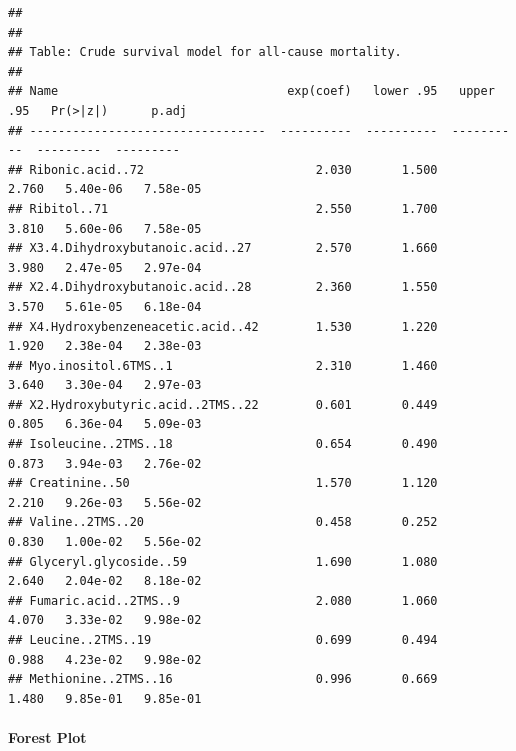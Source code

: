 \documentclass[]{article}
\newenvironment{Shaded}{\begin{snugshade}}{\end{snugshade}}
\newcommand{\CommentTok}[1]{\textcolor[rgb]{0.56,0.35,0.01}{\textit{#1}}}
\newcommand{\DataTypeTok}[1]{\textcolor[rgb]{0.13,0.29,0.53}{#1}}
\newcommand{\KeywordTok}[1]{\textcolor[rgb]{0.13,0.29,0.53}{\textbf{#1}}}
\newcommand{\NormalTok}[1]{#1}
\newcommand{\StringTok}[1]{\textcolor[rgb]{0.31,0.60,0.02}{#1}}
\let\oldparagraph\paragraph
\renewcommand{\paragraph}[1]{\oldparagraph{#1}\mbox{}}
\begin{document}
\begin{verbatim}
## 
## 
## Table: Crude survival model for all-cause mortality.
## 
## Name                                exp(coef)   lower .95   upper .95   Pr(>|z|)      p.adj
## ---------------------------------  ----------  ----------  ----------  ---------  ---------
## Ribonic.acid..72                        2.030       1.500       2.760   5.40e-06   7.58e-05
## Ribitol..71                             2.550       1.700       3.810   5.60e-06   7.58e-05
## X3.4.Dihydroxybutanoic.acid..27         2.570       1.660       3.980   2.47e-05   2.97e-04
## X2.4.Dihydroxybutanoic.acid..28         2.360       1.550       3.570   5.61e-05   6.18e-04
## X4.Hydroxybenzeneacetic.acid..42        1.530       1.220       1.920   2.38e-04   2.38e-03
## Myo.inositol.6TMS..1                    2.310       1.460       3.640   3.30e-04   2.97e-03
## X2.Hydroxybutyric.acid..2TMS..22        0.601       0.449       0.805   6.36e-04   5.09e-03
## Isoleucine..2TMS..18                    0.654       0.490       0.873   3.94e-03   2.76e-02
## Creatinine..50                          1.570       1.120       2.210   9.26e-03   5.56e-02
## Valine..2TMS..20                        0.458       0.252       0.830   1.00e-02   5.56e-02
## Glyceryl.glycoside..59                  1.690       1.080       2.640   2.04e-02   8.18e-02
## Fumaric.acid..2TMS..9                   2.080       1.060       4.070   3.33e-02   9.98e-02
## Leucine..2TMS..19                       0.699       0.494       0.988   4.23e-02   9.98e-02
## Methionine..2TMS..16                    0.996       0.669       1.480   9.85e-01   9.85e-01
\end{verbatim}

\newpage

\hypertarget{forest-plot-2}{%
\paragraph{Forest Plot}\label{forest-plot-2}}

\begin{Shaded}
\end{Shaded}
\end{document}
